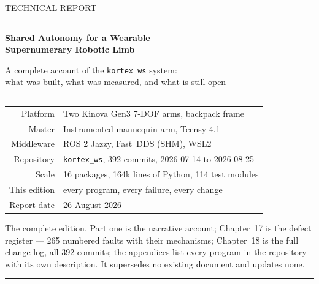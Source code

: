 \documentclass[11pt,a4paper,oneside]{report}
\newcommand{\code}[1]{\texttt{\small #1}}
\begin{document}
\begin{titlepage}
\centering
\vspace*{22mm}
{\sffamily\color{srlgrey}\large TECHNICAL REPORT\par}
\vspace{4mm}
{\color{srlrule}\rule{\textwidth}{1.2pt}}
\vspace{10mm}

{\sffamily\bfseries\color{srlblue}\Huge Shared Autonomy for a Wearable\\[3mm] Supernumerary Robotic Limb\par}
\vspace{9mm}
{\sffamily\large\color{srlgrey} A complete account of the \code{kortex\_ws} system:\\ what was built, what was measured, and what is still open\par}

\vspace{10mm}
{\color{srlrule}\rule{\textwidth}{0.6pt}}
\vspace{12mm}

\begin{tabular}{@{}r@{\hspace{10mm}}l@{}}
\sffamily\color{srlgrey}Platform & Two Kinova Gen3 7-DOF arms, backpack frame \\
\sffamily\color{srlgrey}Master & Instrumented mannequin arm, Teensy 4.1 \\
\sffamily\color{srlgrey}Middleware & ROS 2 Jazzy, Fast~DDS (SHM), WSL2 \\
\sffamily\color{srlgrey}Repository & \code{kortex\_ws}, 392 commits, 2026-07-14 to 2026-08-25 \\
\sffamily\color{srlgrey}Scale & 16 packages, 164k lines of Python, 114 test modules \\
\sffamily\color{srlgrey}This edition & every program, every failure, every change \\
\sffamily\color{srlgrey}Report date & 26 August 2026 \\
\end{tabular}

\vfill
{\small\sffamily\color{srlgrey}
The complete edition. Part one is the narrative account; Chapter~17 is the
defect register --- 265 numbered faults with their mechanisms; Chapter~18 is
the full change log, all 392 commits; the appendices list every program in the
repository with its own description. It supersedes no existing document and
updates none.\par}
\vspace{6mm}
{\color{srlrule}\rule{\textwidth}{1.2pt}}
\end{titlepage}
\end{document}
